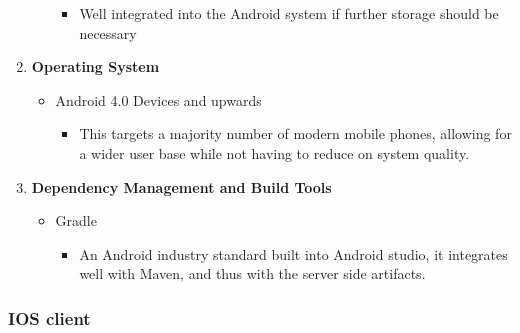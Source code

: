 \documentclass{article}
\begin{document}
\begin{enumerate}
\begin{itemize}
\begin{itemize}
						\item Well integrated into the Android system if further storage should be necessary
					\end{itemize}
				\end{itemize}
				\item \textbf{Operating System}
			\begin{itemize}
	 				\item Android 4.0 Devices and upwards
	 				\begin{itemize}
	 					\item This targets a majority number of modern mobile phones, allowing for a wider user base while not having to reduce on system quality.
	 				\end{itemize}
				\end{itemize}
			\item \textbf{Dependency Management and Build Tools}
				\begin{itemize}
					\item Gradle
					\begin{itemize}
						\item An Android industry standard built into Android studio, it integrates well with Maven, and thus with the server side artifacts.
					\end{itemize}
				\end{itemize}
			\end{enumerate}
	
		\pagebreak
		
		\subsubsection{IOS client}
		
\end{document}
